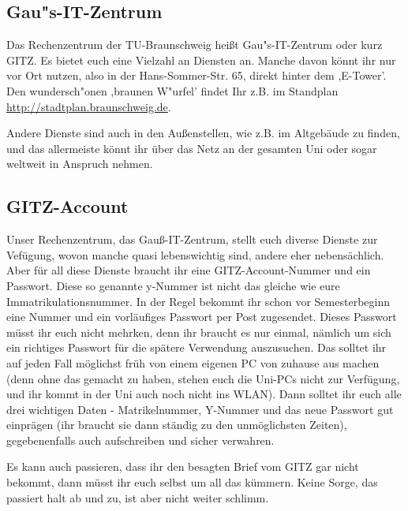 \subsection{Gau"s-IT-Zentrum}
Das Rechenzentrum der TU-Braunschweig heißt Gau"s-IT-Zentrum oder kurz GITZ. Es bietet euch eine Vielzahl an Diensten an. Manche davon könnt ihr nur vor Ort nutzen, also in der Hans-Sommer-Str. 65, direkt hinter dem ,E-Tower'. Den wundersch"onen ,braunen W"urfel' findet Ihr z.B. im Standplan \url{http://stadtplan.braunschweig.de}.

Andere Dienste sind auch in den Außenstellen, wie z.B. im Altgebäude zu finden, und das allermeiste könnt ihr über das Netz an der gesamten Uni oder sogar weltweit in Anspruch nehmen.

\subsection{GITZ-Account}
\label{todogitz}
Unser Rechenzentrum, das Gauß-IT-Zentrum, stellt euch diverse 
Dienste zur Vefügung, wovon manche quasi lebenswichtig sind, 
andere eher nebensächlich. Aber für all diese Dienste braucht 
ihr eine GITZ-Account-Nummer und ein Passwort. Diese so genannte 
y-Nummer ist nicht das gleiche wie eure Immatrikulationsnummer. 
In der Regel bekommt ihr schon vor Semesterbeginn eine Nummer 
und ein vorläufiges Passwort per Post zugesendet. Dieses 
Passwort müsst ihr euch nicht mehrken, denn ihr braucht es nur 
einmal, nämlich um sich ein richtiges Passwort für die spätere 
Verwendung auszusuchen. Das solltet ihr auf jeden Fall möglichst 
früh von einem eigenen PC von zuhause aus machen (denn ohne das 
gemacht zu haben, stehen euch die Uni-PCs nicht zur Verfügung, 
und ihr kommt in der Uni auch noch nicht ins WLAN). Dann solltet 
ihr euch alle drei wichtigen Daten - Matrikelnummer, Y-Nummer 
und das neue Passwort gut einprägen (ihr braucht sie dann 
ständig zu den unmöglichsten Zeiten), gegebenenfalls auch 
aufschreiben und sicher verwahren.

Es kann auch passieren, dass ihr den besagten Brief vom GITZ 
gar nicht bekommt, dann müsst ihr euch selbst um all das kümmern. 
Keine Sorge, das passiert halt ab und zu, ist aber nicht weiter 
schlimm.

